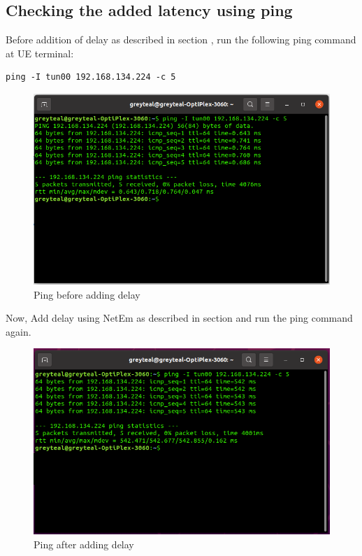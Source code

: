 \subsection{Checking the added latency using ping}
Before addition of delay as described in section , run the following ping command at UE terminal:
\begin{lstlisting}
ping -I tun00 192.168.134.224 -c 5
\end{lstlisting}
\begin{figure}[h!]
\centering
\includegraphics[width=0.7\columnwidth]{./Figures/Ping_before_adding_delay.png}
\caption{Ping before adding delay}
\label{Ping_before_adding_delay}
\end{figure}
Now, Add delay using NetEm as described in section  and run the ping command again.
\begin{figure}[h!]
\centering
\includegraphics[width=0.7\columnwidth]{./Figures/Ping_after_adding_delay.png}
\caption{Ping after adding delay}
\label{Ping_after_adding_delay}
\end{figure}
%
\newpage
